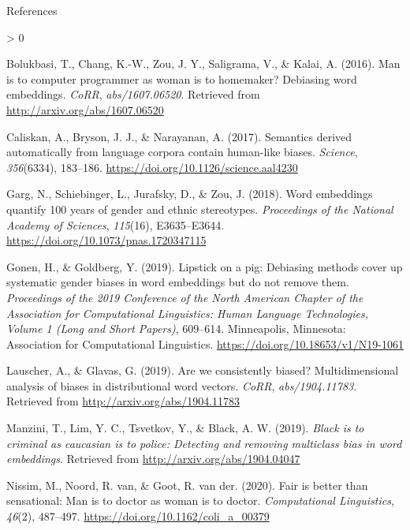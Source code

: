 \documentclass[
  10pt,
  ignorenonframetext,
  x11names, dvipsnames, bibspacing,natbib]{beamer}
\newlength{\cslhangindent}
\newenvironment{CSLReferences}[2] %
 {%
  \setlength{\parindent}{0pt}
  \ifodd #1 \everypar{\setlength{\hangindent}{\cslhangindent}}\ignorespaces\fi
  \ifnum #2 > 0
  \setlength{\parskip}{#2\baselineskip}
  \fi
 }%
 {}
\begin{document}
\begin{frame}{References}
\protect\hypertarget{references}{}
\tiny

\hypertarget{refs}{}
\begin{CSLReferences}{1}{0}
\leavevmode\hypertarget{ref-Bolukbasi2016Man}{}%
Bolukbasi, T., Chang, K.-W., Zou, J. Y., Saligrama, V., \& Kalai, A.
(2016). Man is to computer programmer as woman is to homemaker?
Debiasing word embeddings. \emph{CoRR}, \emph{abs/1607.06520}. Retrieved
from \url{http://arxiv.org/abs/1607.06520}

\leavevmode\hypertarget{ref-Caliskan2017semanticsBiases}{}%
Caliskan, A., Bryson, J. J., \& Narayanan, A. (2017). Semantics derived
automatically from language corpora contain human-like biases.
\emph{Science}, \emph{356}(6334), 183--186.
\url{https://doi.org/10.1126/science.aal4230}

\leavevmode\hypertarget{ref-Garg2018years}{}%
Garg, N., Schiebinger, L., Jurafsky, D., \& Zou, J. (2018). Word
embeddings quantify 100 years of gender and ethnic stereotypes.
\emph{Proceedings of the National Academy of Sciences}, \emph{115}(16),
E3635--E3644. \url{https://doi.org/10.1073/pnas.1720347115}

\leavevmode\hypertarget{ref-Gonen2019lipstick}{}%
Gonen, H., \& Goldberg, Y. (2019). Lipstick on a pig: {D}ebiasing
methods cover up systematic gender biases in word embeddings but do not
remove them. \emph{Proceedings of the 2019 Conference of the North
{A}merican Chapter of the Association for Computational Linguistics:
Human Language Technologies, Volume 1 (Long and Short Papers)},
609--614. Minneapolis, Minnesota: Association for Computational
Linguistics. \url{https://doi.org/10.18653/v1/N19-1061}

\leavevmode\hypertarget{ref-Lauscher2019multidimensional}{}%
Lauscher, A., \& Glavas, G. (2019). Are we consistently biased?
Multidimensional analysis of biases in distributional word vectors.
\emph{CoRR}, \emph{abs/1904.11783}. Retrieved from
\url{http://arxiv.org/abs/1904.11783}

\leavevmode\hypertarget{ref-Manzini2019blackToCriminal}{}%
Manzini, T., Lim, Y. C., Tsvetkov, Y., \& Black, A. W. (2019).
\emph{Black is to criminal as caucasian is to police: Detecting and
removing multiclass bias in word embeddings}. Retrieved from
\url{http://arxiv.org/abs/1904.04047}

\leavevmode\hypertarget{ref-Nissim2020fair}{}%
Nissim, M., Noord, R. van, \& Goot, R. van der. (2020). Fair is better
than sensational: Man is to doctor as woman is to doctor.
\emph{Computational Linguistics}, \emph{46}(2), 487--497.
\url{https://doi.org/10.1162/coli_a_00379}

\end{CSLReferences}
\end{frame}
\end{document}
